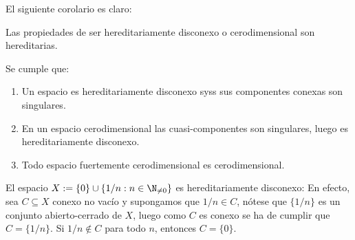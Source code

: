 \documentclass[topologia-analisis.tex]{subfiles}
\begin{document}
El siguiente corolario es claro:
\begin{cor}
	Las propiedades de ser hereditariamente disconexo o cerodimensional son hereditarias.
\end{cor}
\begin{thm}
	Se cumple que:
	\begin{enumerate}
		\item Un espacio es hereditariamente disconexo syss sus componentes conexas son singulares.
		\item En un espacio cerodimensional las cuasi-componentes son singulares, luego es hereditariamente disconexo.
		\item Todo espacio fuertemente cerodimensional es cerodimensional.
	\end{enumerate}
\end{thm}

\begin{ex}
	El espacio $X := \{0\} \cup \{1/n : n \in \N_{\ne 0}\}$ es hereditariamente disconexo:
	En efecto, sea $C \subseteq X$ conexo no vacío y supongamos que $1/n \in C$, nótese que $\{1/n\}$ es un conjunto abierto-cerrado de $X$,
	luego como $C$ es conexo se ha de cumplir que $C = \{1/n\}$.
	Si $1/n \notin C$ para todo $n$, entonces $C = \{0\}$.
\end{ex}
\end{document}
